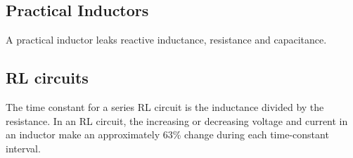 \subsection{Practical Inductors}
A practical inductor leaks reactive inductance, resistance and capacitance. 


\subsection{RL circuits}
The time constant for a series RL circuit is the inductance divided by the resistance. In an RL circuit, the increasing or decreasing voltage and current in an inductor make an approximately 63\% change during each time-constant interval. 
